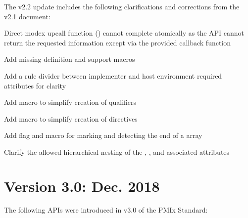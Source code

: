 The v2.2 update includes the following clarifications and corrections from the v2.1 document:

\begin{compactitemize}
    \item Direct modex upcall function () cannot complete atomically as the \ac{API} cannot return the requested information except via the provided callback function
    \item Add missing  definition and support macros
    \item Add a rule divider between implementer and host environment required attributes for clarity
    \item Add  macro to simplify creation of  qualifiers
    \item Add  macro to simplify creation of  directives
    \item Add flag and  macro for marking and detecting the end of a  array
    \item Clarify the allowed hierarchical nesting of the , , and associated attributes
\end{compactitemize}

\section{Version 3.0: Dec. 2018}

The following \acp{API} were introduced in v3.0 of the PMIx Standard:

